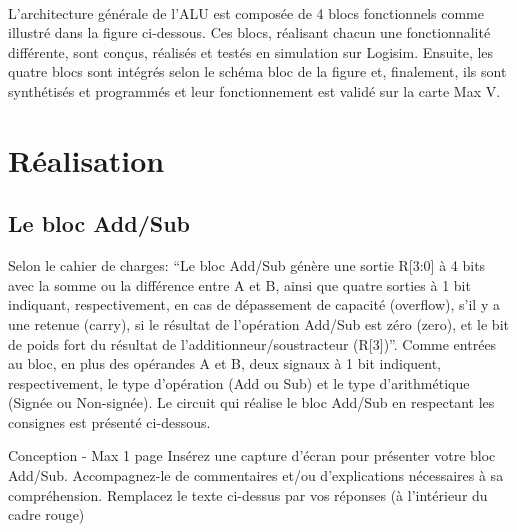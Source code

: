 \documentclass[a4paper]{article}
\begin{document}
\paragraph{}
L’architecture générale de l’ALU est composée de 4 blocs fonctionnels comme illustré dans la figure ci-dessous. Ces blocs, réalisant chacun une fonctionnalité différente, sont conçus, réalisés et testés en simulation sur Logisim. Ensuite, les quatre blocs sont intégrés selon le schéma bloc de la figure et, finalement, ils sont synthétisés et programmés et leur fonctionnement est validé sur la carte Max V. 

\section{Réalisation}
\subsection{Le bloc Add/Sub}
\label{add_Sub}

Selon le cahier de charges: “Le bloc Add/Sub génère une sortie R[3:0] à 4 bits avec la somme ou la différence entre A et B, ainsi que quatre sorties à 1 bit indiquant, respectivement, en cas de dépassement de capacité (overflow), s’il y a une retenue (carry), si le résultat de l’opération Add/Sub est zéro (zero), et le bit de poids fort du résultat de l’additionneur/soustracteur (R[3])”. Comme entrées au bloc, en plus des opérandes A et B, deux signaux à 1 bit indiquent, respectivement, le type d’opération (Add ou Sub) et le type d’arithmétique (Signée ou Non-signée). Le circuit qui réalise le bloc Add/Sub en respectant les consignes est présenté ci-dessous.


\begin{tcolorbox}[colframe=Monokaimagenta,colback=white]
Conception - Max 1 page 
Insérez une capture d’écran pour présenter votre bloc Add/Sub.
Accompagnez-le de commentaires et/ou d’explications nécessaires à sa compréhension.
Remplacez le texte ci-dessus par vos réponses (à l’intérieur du cadre rouge)
\end{tcolorbox}
\end{document}
